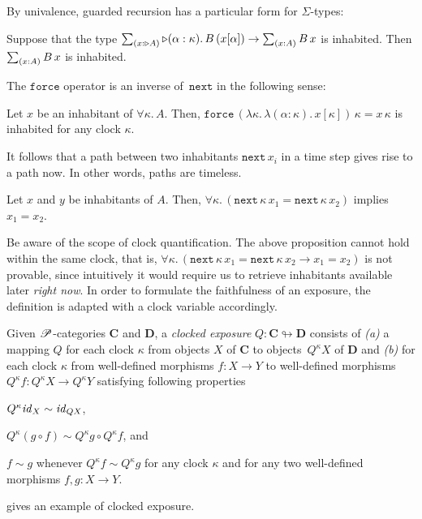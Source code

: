 \documentclass[a4paper,UKenglish,numberwithinsect,cleveref,thm-restate]{lipics-v2021}
\numberwithin{equation}{section}
\theoremstyle{definition}
\theoremstyle{plain}
\begin{document}
By univalence, guarded recursion has a particular form for $\Sigma$-types:
\begin{corollary} \label{coro:lob-induction-sum}
  Suppose that the type $\sm{x : \laterp A} \laterp (\alpha : \kappa).\,B\,(x[\alpha]) \to \sm{x : A} B\,x$ is inhabited.
  Then $\sm{x : A} B\,x$ is inhabited.
\end{corollary}

The $\mathtt{force}$ operator is an inverse of~$\mathtt{next}$ in the following sense:
\begin{lemma}
  Let $x$ be an inhabitant of $\forall \kappa.\, A$. Then, 
  $\mathtt{force}\,(\lambda \kappa.\,\lambda (\alpha : \kappa).\, x [\kappa])\,\kappa = x\,\kappa$ is inhabited for any clock $\kappa$.
\end{lemma}

It follows that a path between two inhabitants $\mathtt{next}\,x_i$ in a time step gives rise to a path now.
In other words, paths are timeless.
\begin{proposition}\label{lem:later-identity}
  Let $x$ and $y$ be inhabitants of $A$. Then, $\forall \kappa.\, \left(\mathtt{next}\,\kappa\,x_1 = \mathtt{next}\,\kappa\,x_2\right)$ implies $x_1 = x_2$.
\end{proposition}
Be aware of the scope of clock quantification.
The above proposition cannot hold within the same clock, that is, $\forall \kappa.\, \left(\mathtt{next}\,\kappa\,x_1 = \mathtt{next}\,\kappa\,x_2 \to x_1 =x_2\right)$ is not provable, since intuitively it would require us to retrieve inhabitants available later \emph{right now}.
In order to formulate the faithfulness of an exposure, the definition is adapted with a clock variable accordingly.
\begin{definition}
  Given $\mathscr{P}$-categories $\mathbf{C}$ and $\mathbf{D}$, a \emph{clocked exposure} $Q\colon \mathbf{C} \looparrowright \mathbf{D}$ consists of \emph{(a)} a mapping $Q$ for each clock $\kappa$ from objects $X$ of $\mathbf{C}$ to objects~$Q^\kappa X$ of $\mathbf{D}$ and \emph{(b)} for each clock $\kappa$ from well-defined morphisms $f\colon X \to Y$ to well-defined morphisms $Q^\kappa f\colon Q^\kappa X \to Q^\kappa Y$ satisfying following properties
  \begin{romanenumerate}
    \item $Q^\kappa \mathit{id}_X \sim \mathit{id}_{QX}$,
    \item $Q^\kappa (g \circ f) \sim Q^\kappa g \circ Q^\kappa f$, and
    \item $f \sim g$ whenever $Q^\kappa f \sim Q^\kappa g$ for any clock $\kappa$ and for any two well-defined morphisms $f, g\colon X \to Y$. 
  \end{romanenumerate}
\end{definition}
 gives an example of clocked exposure.
\end{document}
